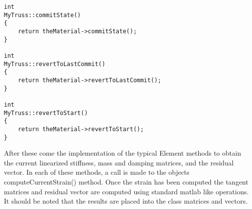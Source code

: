 \documentclass[12pt]{article}
\begin{document}
{\sf\small
\begin{verbatim}
int
MyTruss::commitState()
{
    return theMaterial->commitState();
}

int
MyTruss::revertToLastCommit()
{
    return theMaterial->revertToLastCommit();
}

int
MyTruss::revertToStart()
{
    return theMaterial->revertToStart();
}
\end{verbatim}
}

After these come the implementation of the typical Element methods to
obtain the current linearized stiffness, mass and damping matrices, and
the residual vector. In each of these methods, a call is made to the
objects {\sf computeCurrentStrain()} method. Once the strain has been
computed the tangent matrices and residual vector are computed using
standard matlab like operations. It should be noted that the results
are placed into the class matrices and vectors.
\end{document}
